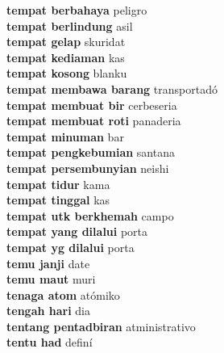 \textbf{ tempat berbahaya  } peligro \\
\textbf{ tempat berlindung  } asil \\
\textbf{ tempat gelap  } skuridat \\
\textbf{ tempat kediaman  } kas \\
\textbf{ tempat kosong  } blanku \\
\textbf{ tempat membawa barang  } transportadó \\
\textbf{ tempat membuat bir  } cerbeseria \\
\textbf{ tempat membuat roti  } panaderia \\
\textbf{ tempat minuman  } bar \\
\textbf{ tempat pengkebumian  } santana \\
\textbf{ tempat persembunyian  } neishi \\
\textbf{ tempat tidur  } kama \\
\textbf{ tempat tinggal  } kas \\
\textbf{ tempat utk berkhemah  } campo \\
\textbf{ tempat yang dilalui  } porta \\
\textbf{ tempat yg dilalui  } porta \\
\textbf{ temu janji  } date \\
\textbf{ temu maut  } muri \\
\textbf{ tenaga atom  } atómiko \\
\textbf{ tengah hari  } dia \\
\textbf{ tentang pentadbiran  } atministrativo \\
\textbf{ tentu had  } definí \\
